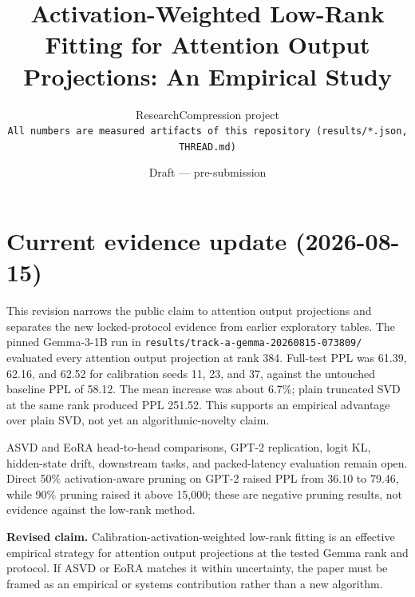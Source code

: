 \documentclass[11pt]{article}
\title{Activation-Weighted Low-Rank Fitting for Attention Output Projections:
An Empirical Study}
\author{ResearchCompression project\\
\texttt{All numbers are measured artifacts of this repository (results/*.json, THREAD.md)}}
\date{Draft --- pre-submission}
\begin{document}
\maketitle

\section*{Current evidence update (2026-08-15)}
This revision narrows the public claim to attention output projections and
separates the new locked-protocol evidence from earlier exploratory tables.
The pinned Gemma-3-1B run in
\texttt{results/track-a-gemma-20260815-073809/} evaluated every attention
output projection at rank 384. Full-test PPL was 61.39, 62.16, and 62.52 for
calibration seeds 11, 23, and 37, against the untouched baseline PPL of
58.12. The mean increase was about 6.7\%; plain truncated SVD at the same
rank produced PPL 251.52. This supports an empirical advantage over plain
SVD, not yet an algorithmic-novelty claim.

ASVD and EoRA head-to-head comparisons, GPT-2 replication, logit KL,
hidden-state drift, downstream tasks, and packed-latency evaluation remain
open. Direct 50\% activation-aware pruning on GPT-2 raised PPL from 36.10 to
79.46, while 90\% pruning raised it above 15,000; these are negative pruning
results, not evidence against the low-rank method.

\textbf{Revised claim.} Calibration-activation-weighted low-rank fitting is
an effective empirical strategy for attention output projections at the
tested Gemma rank and protocol. If ASVD or EoRA matches it within uncertainty,
the paper must be framed as an empirical or systems contribution rather than
a new algorithm.
\end{document}
